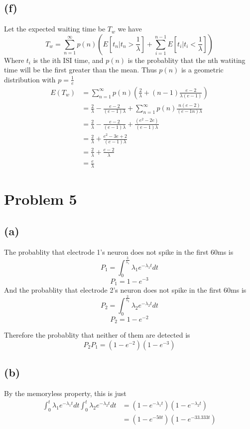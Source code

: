 \documentclass[12pt]{article}
\begin{document}
\subsection*{(f)}
Let the expected waiting time be $T_w$ we have
$$T_w=\sum_{n=1}^\infty p(n) \left(E[t_n|t_n>\frac{1}{\lambda}]+\sum_{i=1}^{n-1}E[t_i|t_i<\frac{1}{\lambda}]\right)$$
Where $t_i$ is the ith ISI time, and $p(n)$ is the probablity that the nth watiting time will be the
first greater than the mean. Thus $p(n)$ is a geometric distribution with $p=\frac{1}{e}$
\begin{align*}
    E(T_w)&=
    \sum_{n=1}^{\infty} p(n)\left(\frac{2}{\lambda}+(n-1)\frac{e-2}{\lambda(e-1)}\right)\\
    &=\frac{2}{\lambda}-\frac{e-2}{(e-1)\lambda}+\sum_{n=1}^{\infty} p(n)\frac{n(e-2)}{(e-1n)\lambda}\\
    &=\frac{2}{\lambda}-\frac{e-2}{(e-1)\lambda}+\frac{(e^2-2e)}{(e-1)\lambda}\\
    &=\frac{2}{\lambda}+\frac{e^2-3e+2}{(e-1)\lambda}\\
    &=\frac{2}{\lambda}+\frac{e-2}{\lambda}\\
    &=\boxed{\frac{e}{\lambda}}
\end{align*}
\section*{Problem 5}
\subsection*{(a)}
The probablity that electrode 1's neuron does not spike in the first 60ms is 
$$P_{1}=\int_{0}^{\frac{3}{\lambda_1}}\lambda_1 e^{-\lambda_1 t}dt$$
$$P_{1}=1-e^{-3}$$
And the probablity that electrode 2's neuron does not spike in the first 60ms is 
$$P_{2}=\int_{0}^{\frac{2}{\lambda_2}}\lambda_2 e^{-\lambda_2 t}dt$$
$$P_{2}=1-e^{-2}$$

Therefore the probablity that neither of them are detected is 
$$P_{2}P_{1}=(1-e^{-2})(1-e^{-3})$$
\subsection*{(b)}
By the memoryless property, this is just
\begin{align*}
    \int_{0}^{t}\lambda_1 e^{-\lambda_1 t}dt\int_{0}^{t}\lambda_2 e^{-\lambda_2 t}dt
    &=(1-e^{-\lambda_1t})(1-e^{-\lambda_2t})\\
    &=\boxed{(1-e^{-50t})(1-e^{-33.333t})}
\end{align*}
\end{document}
